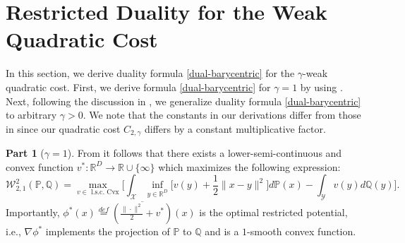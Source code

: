 \documentclass{article} %
\DeclareMathOperator{\CVar}{CVar}
\DeclareMathOperator{\Dist}{Dist}
\begin{document}



\section{Restricted Duality for the Weak Quadratic Cost}
\label{sec-restricted-duality}
In this section, we derive duality formula \eqref{dual-barycentric} for the $\gamma$-weak quadratic cost. First, we derive formula \eqref{dual-barycentric} for $\gamma=1$ by using \citep[Theorems 1.1, 1.2]{gozlan2020mixture}. Next, following the discussion in \citep[]{gozlan2020mixture}, we generalize duality formula \eqref{dual-barycentric} to arbitrary $\gamma>0$. We note that the constants in our derivations differ from those in \citep{gozlan2020mixture} since our quadratic cost $C_{2,\gamma}$ differs by a constant multiplicative factor.

\textbf{Part 1} ($\gamma=1$). From \citep[Theorems 1.1, 1.2]{gozlan2020mixture} it follows that there exists a lower-semi-continuous and convex function $v^{*}:\mathbb{R}^{D}\rightarrow\mathbb{R}\cup\{\infty\}$ which maximizes the following expression:
\begin{equation}
    \mathcal{W}_{2,1}^{2}(\mathbb{P},\mathbb{Q})=\max_{v\in\text{ l.s.c. Cvx}}\bigg[\int_{\mathcal{X}}\inf_{y\in\mathbb{R}^{D}}\big[v(y)+\frac{1}{2}\|x-y\|^{2}\big] d\mathbb{P}(x)-\int_{\mathcal{Y}}v(y) d\mathbb{Q}(y)\bigg].
    \label{w21-dual}
\end{equation}
Importantly, $\phi^{*}(x)\stackrel{def}{=}\overline{(\frac{\|\cdot\|^{2}}{2}+v^{*})}(x)$ is the optimal restricted potential, i.e., $\nabla\phi^{*}$ implements the projection of $\mathbb{P}$ to $\mathbb{Q}$ and is a $1$-smooth convex function.
\end{document}
